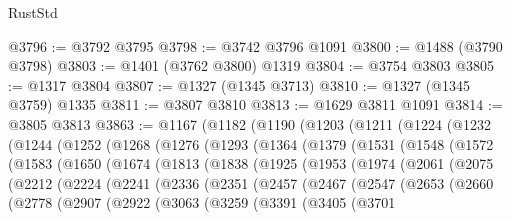 \begin{lexlean}{RustStd}
\begin{coremodule}
@3796 := @3792 @3795
@3798 := @3742 @3796 @1091
@3800 := @1488 (@3790 @3798)
@3803 := @1401 (@3762 @3800) @1319
@3804 := @3754 @3803
@3805 := @1317 @3804
@3807 := @1327 (@1345 @3713)
@3810 := @1327 (@1345 @3759) @1335
@3811 := @3807 @3810
@3813 := @1629 @3811 @1091
@3814 := @3805 @3813
@3863 := @1167
    (@1182
      (@1190
        (@1203
          (@1211
            (@1224
              (@1232
                (@1244
                  (@1252
                    (@1268
                      (@1276
                        (@1293
                          (@1364
                            (@1379
                              (@1531
                                (@1548
                                  (@1572
                                    (@1583
                                      (@1650
                                        (@1674
                                          (@1813
                                            (@1838
                                              (@1925
                                                (@1953
                                                  (@1974
                                                    (@2061
                                                      (@2075
                                                        (@2212
                                                          (@2224
                                                            (@2241
                                                              (@2336
                                                                (@2351
                                                                  (@2457
                                                                    (@2467
                                                                      (@2547
                                                                        (@2653
                                                                          (@2660
                                                                            (@2778
                                                                              (@2907
                                                                                (@2922
                                                                                  (@3063
                                                                                    (@3259
                                                                                      (@3391
                                                                                        (@3405
                                                                                          (@3701

\end{coremodule}
\end{lexlean}
